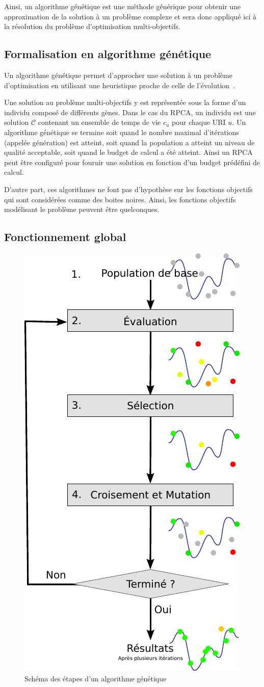 Ainsi, un algorithme génétique est une méthode générique pour obtenir une approximation de la solution à un problème complexe et sera donc appliqué ici à la résolution du problème d'optimisation multi-objectifs.

\subsection{Formalisation en algorithme génétique}

Un algorithme génétique permet d'approcher une solution à un problème d'optimisation en utilisant une heuristique proche de celle de l'évolution~\cite{Luke2013Metaheuristics}.

Une solution au problème multi-objectifs y est représentée sous la forme d'un individu composé de différents gènes.
Dans le cas du \ac{RPCA}, un individu est une solution $\mathcal{C}$ contenant un ensemble de temps de vie $c_u$ pour chaque \ac{URI} $u$.
Un algorithme génétique se termine soit quand le nombre maximal d'itérations (appelée génération) est atteint, soit quand la population a atteint un niveau de qualité acceptable, soit quand le budget de calcul a été atteint.
Ainsi un \ac{RPCA} peut être configuré pour fournir une solution en fonction d'un budget prédéfini de calcul.

D'autre part, ces algorithmes ne font pas d'hypothèse sur les fonctions objectifs qui sont considérées comme des boites noires.
Ainsi, les fonctions objectifs modélisant le problème peuvent être quelconques.

\subsection{Fonctionnement global}

\begin{figure}[h!]
  \centering
  \includegraphics[width=.4\textwidth]{img/algo_genetique.pdf}
  \caption{Schéma des étapes d'un algorithme génétique}
  \label{cache:fig:genetic_schema}
\end{figure}

